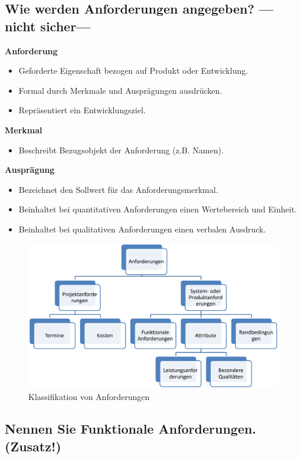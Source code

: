 \subsection{Wie werden Anforderungen angegeben?   ---nicht sicher---}

\textbf{Anforderung}
\begin{itemize}
    \item Geforderte Eigenschaft bezogen auf Produkt oder Entwicklung.
    \item Formal durch Merkmale und Ausprägungen ausdrücken.
    \item Repräsentiert ein Entwicklungsziel.
\end{itemize}

\textbf{Merkmal}
\begin{itemize}
    \item Beschreibt Bezugsobjekt der Anforderung (z.B. Namen).
\end{itemize}

\textbf{Ausprägung}
\begin{itemize}
    \item Bezeichnet den Sollwert für das Anforderungsmerkmal.
    \item Beinhaltet bei quantitativen Anforderungen einen Wertebereich und Einheit.
    \item Beinhaltet bei qualitativen Anforderungen einen verbalen Ausdruck.
\end{itemize}

\begin{figure}[H]
    \centering
    \includegraphics[width=0.7\linewidth]{Bilder/Teil2_KlassifikationAnforderungen.png}
    \caption{Klassifikation von Anforderungen}
\end{figure}

\subsection{Nennen Sie Funktionale Anforderungen. (Zusatz!)}

